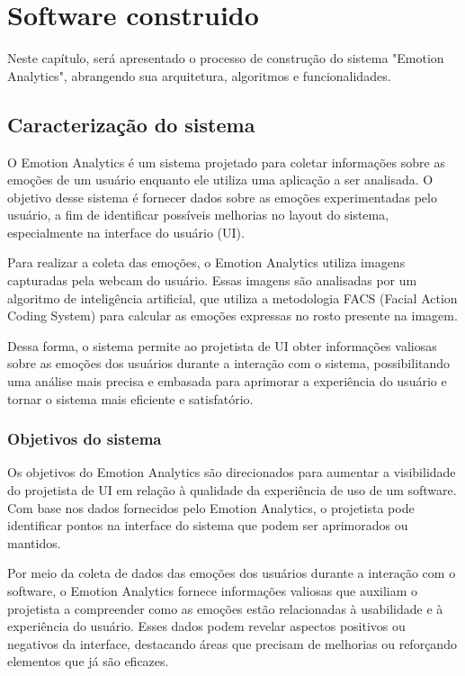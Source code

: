 \chapter{Software construido}

Neste capítulo, será apresentado o processo de construção do sistema "Emotion Analytics", abrangendo sua arquitetura, algoritmos e funcionalidades.

\section{Caracterização do sistema}

O Emotion Analytics é um sistema projetado para coletar informações sobre as emoções de um usuário enquanto ele utiliza uma aplicação a ser analisada. O objetivo desse sistema é fornecer dados sobre as emoções experimentadas pelo usuário, a fim de identificar possíveis melhorias no layout do sistema, especialmente na interface do usuário (UI).

Para realizar a coleta das emoções, o Emotion Analytics utiliza imagens capturadas pela webcam do usuário. Essas imagens são analisadas por um algoritmo de inteligência artificial, que utiliza a metodologia FACS (Facial Action Coding System) para calcular as emoções expressas no rosto presente na imagem.

Dessa forma, o sistema permite ao projetista de UI obter informações valiosas sobre as emoções dos usuários durante a interação com o sistema, possibilitando uma análise mais precisa e embasada para aprimorar a experiência do usuário e tornar o sistema mais eficiente e satisfatório.

\subsection{Objetivos do sistema}

Os objetivos do Emotion Analytics são direcionados para aumentar a visibilidade do projetista de UI em relação à qualidade da experiência de uso de um software. Com base nos dados fornecidos pelo Emotion Analytics, o projetista pode identificar pontos na interface do sistema que podem ser aprimorados ou mantidos.

Por meio da coleta de dados das emoções dos usuários durante a interação com o software, o Emotion Analytics fornece informações valiosas que auxiliam o projetista a compreender como as emoções estão relacionadas à usabilidade e à experiência do usuário. Esses dados podem revelar aspectos positivos ou negativos da interface, destacando áreas que precisam de melhorias ou reforçando elementos que já são eficazes.

